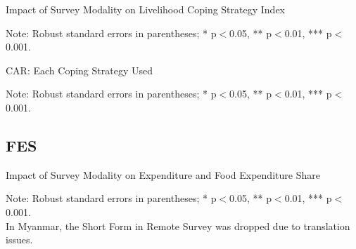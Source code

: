\documentclass[11pt,harvard]{article}
\begin{document}
	\begin{table}[htbp]
		\centering
		\begin{adjustbox}{max width=\textwidth}
			\begin{threeparttable}
				\caption{Impact of Survey Modality on Livelihood Coping Strategy Index}
				\scriptsize
				 
				\label{tab:LCS_Modality_CAR}
				\begin{tablenotes}
					\item Note: Robust standard errors in parentheses; * p$<$0.05, ** p$<$0.01, *** p$<$0.001. 
				\end{tablenotes}
			\end{threeparttable}
		\end{adjustbox}
	\end{table}

	\begin{table}[htbp]
		\centering
		\begin{adjustbox}{max width=\textwidth}
			\begin{threeparttable}
				\caption{CAR: Each Coping Strategy Used}
				\scriptsize
				 
				\label{tab:LCS_Ind_Modality_CAR}
				\begin{tablenotes}
					\item Note: Robust standard errors in parentheses; * p$<$0.05, ** p$<$0.01, *** p$<$0.001. 
				\end{tablenotes}
			\end{threeparttable}
		\end{adjustbox}
	\end{table}
	\pagebreak
	
	\subsection{FES}
	\begin{table}[htbp]
		\centering
		\begin{adjustbox}{max width=\textwidth}
			\begin{threeparttable}
				\caption{Impact of Survey Modality on Expenditure and Food Expenditure Share}
				\scriptsize
				 
				\label{tab:FES_Modality_CAR}
				\begin{tablenotes}
					\item Note: Robust standard errors in parentheses; * p$<$0.05, ** p$<$0.01, *** p$<$0.001. \\ 
					In Myanmar, the Short Form in Remote Survey was dropped due to translation issues.
				\end{tablenotes}
			\end{threeparttable}
		\end{adjustbox}
	\end{table}
	\pagebreak
	
\end{document}
